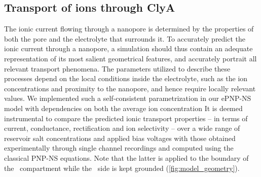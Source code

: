 \documentclass[journal=ancac3,manuscript=article,etalmode=truncate,maxauthors=0,layout=twocolumn]{achemso}
\begin{document}
\subsection{Transport of ions through ClyA}\label{sect:ion_transport}
The ionic current flowing through a nanopore is determined by the properties of both the pore and the 
electrolyte that surrounds it. To accurately predict the ionic current through a nanopore, a simulation 
should thus contain an adequate representation of its most salient geometrical features, and accurately 
portrait all relevant transport phenomena. The parameters utilized to describe these processes depend on the 
local conditions inside the electrolyte, such as the ion concentrations and proximity to the nanopore, and 
hence require locally relevant values. We implemented such a self-consistent parametrization in our ePNP-NS 
model with dependencies on both the average ion concentration %
It is deemed instrumental to compare the predicted ionic transport properties -- in terms of 
current, conductance, rectification and ion selectivity -- over a wide range of reservoir salt concentrations 
and applied bias voltages with those obtained experimentally through single channel recordings and computed 
using the classical PNP-NS equations. Note that the latter is applied to the boundary of the \trans\ 
compartment while the \cis\ side is kept grounded (\cref{fig:model_geometry}).

\end{document}
